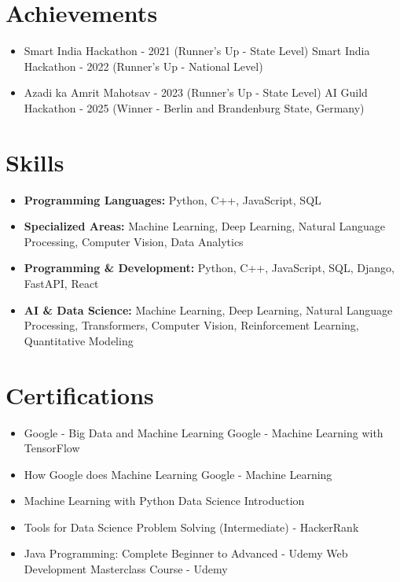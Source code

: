 \documentclass[a4paper,10pt]{article}
\begin{document}
\section*{Achievements}
\begin{itemize}
\item Smart India Hackathon - 2021 (Runner's Up - State Level) \hfill Smart India Hackathon - 2022 (Runner's Up - National Level)
\item Azadi ka Amrit Mahotsav - 2023 (Runner's Up - State Level) \hfill AI Guild Hackathon - 2025 (Winner - Berlin and Brandenburg State, Germany)
\end{itemize}

\section*{Skills}
\begin{itemize}
  \item \textbf{Programming Languages:} Python, C++, JavaScript, SQL
  \item \textbf{Specialized Areas:} Machine Learning, Deep Learning, Natural Language Processing, Computer Vision, Data Analytics
  \item \textbf{Programming \& Development:} Python, C++, JavaScript, SQL, Django, FastAPI, React
  \item \textbf{AI \& Data Science:} Machine Learning, Deep Learning, Natural Language Processing, Transformers, Computer Vision, Reinforcement Learning, Quantitative Modeling
\end{itemize}

\section*{Certifications}
\begin{itemize}
\item Google - Big Data and Machine Learning \hfill Google - Machine Learning with TensorFlow
\item How Google does Machine Learning \hfill Google - Machine Learning
\item Machine Learning with Python \hfill Data Science Introduction
\item Tools for Data Science \hfill Problem Solving (Intermediate) - HackerRank
\item Java Programming: Complete Beginner to Advanced - Udemy \hfill Web Development Masterclass Course - Udemy
\end{itemize}
\end{document}
